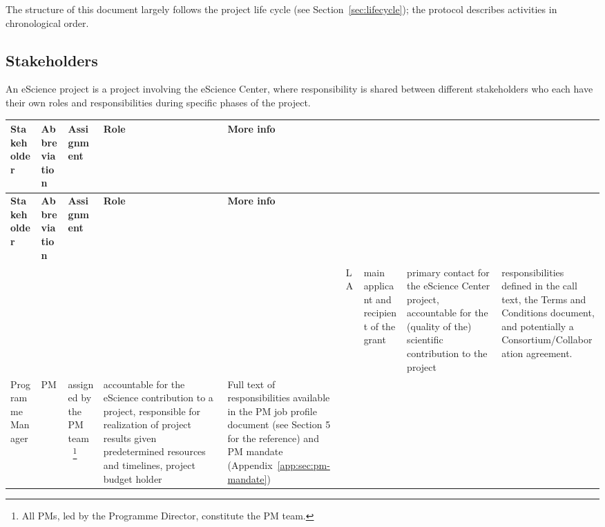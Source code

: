 \documentclass[11pt]{article}
\begin{document}
The structure of this document largely follows the project life cycle (see Section~\ref{sec:lifecycle}); the
protocol describes activities in chronological order.

\subsection{Stakeholders}
An eScience project is a project involving the eScience Center, where responsibility is shared between different
stakeholders who each have their own roles and responsibilities during specific phases of the project.


\begin{tabularx}{\linewidth}{p{}|p{}|p{}|p{}|p{}}%
\toprule
\textbf{Stakeholder} & \textbf{Abbreviation} & \textbf{Assignment}& \textbf{Role}& \textbf{More info}\\
\midrule
\endfirsthead
\toprule
\textbf{Stakeholder} & \textbf{Abbreviation} & \textbf{Assignment}& \textbf{Role}& \textbf{More info}\\
\midrule
\endhead
\midrule
\multicolumn{5}{r}{}
\endfoot
\bottomrule
\endlastfoot  
Lead Applicant                                     & LA                    & main applicant and recipient of the grant                                                                         & primary contact for the eScience Center project, accountable for the (quality of the) scientific contribution to the project                                                                                                           & responsibilities defined in the call text, the Terms and Conditions document, and potentially a Consortium/Collaboration agreement.  \\\hline
Programme Manager                                  & PM                    & assigned by the PM team~\footnote{All PMs, led by the Programme Director, constitute the PM team.}                                                                                          & accountable for the eScience contribution to a project, responsible for realization of project results given predetermined resources and timelines, project budget holder                                                              & Full text of responsibilities available in the PM job profile document (see Section 5 for the reference) and PM mandate (Appendix~\ref{app:sec:pm-mandate}) \\\hline

\end{tabularx}
\end{document}
